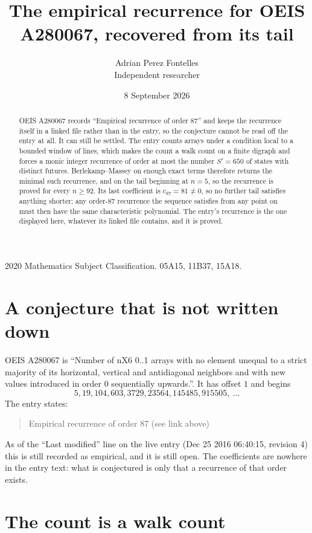 \documentclass[11pt,a4paper]{article}
\title{The empirical recurrence for OEIS A280067, recovered from its tail}
\author{Adrian Perez Fontelles\\ \small Independent researcher}
\date{8 September 2026}
\theoremstyle{plain}
\theoremstyle{definition}
\begin{document}
\maketitle

\begin{abstract}
OEIS A280067 records ``Empirical recurrence of order $87$'' and keeps the recurrence itself in
a linked file rather than in the entry, so the conjecture cannot be read off the entry at all.
It can still be settled. The entry counts arrays under a condition local to a bounded window of
lines, which makes the count a walk count on a finite digraph and forces a monic integer
recurrence of order at most the number $S'=650$ of states with distinct futures. Berlekamp--Massey on
enough exact terms therefore returns the minimal such recurrence, and on the tail beginning at $n=5$, so the recurrence is proved for every $n\ge92$.
Its last coefficient is $c_{87}=81\neq0$, so no further tail satisfies anything
shorter; any order-$87$ recurrence the sequence satisfies from any point on must then have
the same characteristic polynomial. The entry's recurrence is the one displayed here, whatever
its linked file contains, and it is proved.
\end{abstract}

\noindent\small 2020 Mathematics Subject Classification. 05A15, 11B37, 15A18.\normalsize

\section{A conjecture that is not written down}

OEIS A280067 is ``Number of nX6 0..1 arrays with no element unequal to a strict majority of its horizontal, vertical and antidiagonal neighbors and with new values introduced in order 0 sequentially upwards.''. It has offset $1$ and begins
\[
5, 19, 104, 603, 3729, 23564, 145485, 915505,\ \dots
\]
The entry states:
\begin{quote}
Empirical recurrence of order 87 (see link above)
\end{quote}
As of the ``Last modified'' line on the live entry (Dec 25 2016 06:40:15, revision 4)
this is still recorded as empirical, and it is still open. The coefficients are nowhere in the
entry text: what is conjectured is only that a recurrence of that order exists.

\section{The count is a walk count}
\end{document}
